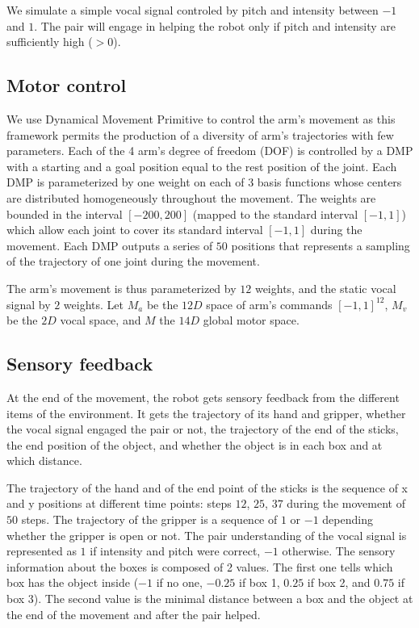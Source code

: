 \documentclass[conference]{include/IEEEtran}
\begin{document}
		We simulate a simple vocal signal controled by pitch and intensity between $-1$ and $1$.
		The pair will engage in helping the robot only if pitch and intensity are sufficiently high ($>0$).
	
	\subsection{Motor control}
	
		We use Dynamical Movement Primitive \cite{ijspeert_dynamical_2013} to control the arm's movement as this framework permits the production of a diversity of arm's trajectories with few parameters.
		Each of the 4 arm's degree of freedom (DOF) is controlled by a DMP with a starting and a goal position equal to the rest position of the joint.
		Each DMP is parameterized by one weight on each of 3 basis functions whose centers are distributed homogeneously throughout the movement.
		The weights are bounded in the interval $[-200,200]$ (mapped to the standard interval $[-1,1]$) which allow each joint to cover its standard interval $[-1,1]$ during the movement.
		Each DMP outputs a series of $50$ positions that represents a sampling of the trajectory of one joint during the movement.
	
		The arm's movement is thus parameterized by $12$ weights, and the static vocal signal by $2$ weights.
		Let $M_a$ be the $12D$ space of arm's commands $[-1,1]^{12}$, $M_v$ be the $2D$ vocal space, and $M$ the $14D$ global motor space.
	
	
	\subsection{Sensory feedback}
	
		At the end of the movement, the robot gets sensory feedback from the different items of the environment.
		It gets the trajectory of its hand and gripper, whether the vocal signal engaged the pair or not, the trajectory of the end of the sticks, 
		the end position of the object, and whether the object is in each box and at which distance.
	
		The trajectory of the hand and of the end point of the sticks is the sequence of x and y positions at different time points: steps $12$, $25$, $37$ during the movement of $50$ steps.
		The trajectory of the gripper is a sequence of $1$ or $-1$ depending whether the gripper is open or not.
		The pair understanding of the vocal signal is represented as $1$ if intensity and pitch were correct, $-1$ otherwise.
		The sensory information about the boxes is composed of 2 values. 
		The first one tells which box has the object inside ($-1$ if no one, $-0.25$ if box 1, $0.25$ if box 2, and $0.75$ if box 3).
		The second value is the minimal distance between a box and the object at the end of the movement and after the pair helped.
		 
\end{document}
